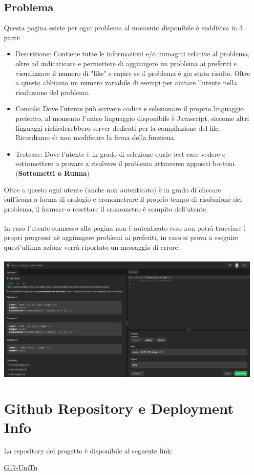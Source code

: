 \documentclass[11pt, a4paper]{article}
\theoremstyle{definition}
\begin{document}
\subsection{Problema}
Questa pagina esiste per ogni problema al momento disponibile è suddivisa in 3 parti:
\begin{itemize}
  \item Descrizione: Contiene tutte le informazioni e/o immagini relative al problema, oltre ad indicaticare e permettere di aggiungere un problema ai preferiti e visualizzare il numero di "like" e capire se il problema è gia stato risolto. Oltre a questo abbiamo un numero variabile di esempi per aiutare l'utente nella risoluzione del problema.
  \item Console: Dove l'utente può scrivere codice e selezionare il proprio linguaggio preferito, al momento l'unico linguaggio disponibile è Javascript, siccome altri linguaggi richiederebbero server dedicati per la compilazione del file. Ricordiamo di non modificare la firma della funziona.
  \item Testcase: Dove l'utente è in grado di selezione quale test case vedere e sottomettere o provare a risolvere il problema attraverso appositi bottoni. (\textbf{Sottometti o Runna})
\end{itemize}
Oltre a questo ogni utente (anche non autenticato) è in grado di cliccare sull'icona a forma di orologio e cronometrare il proprio tempo di risoluzione del problema, il fermare o resettare il cronometro è compito dell'utente.\\\\
In caso l'utente connesso alla pagina non è autenticato esso non potrà tracciare i propri progressi nè aggiungere problemi ai preferiti, in caso si prova a eseguire quest'ultima azione verrà riportato un messaggio di errore.\\\\
\includegraphics[width=\textwidth]{materiale/sito/Problema.png}

\newpage
\section{Github Repository e Deployment Info}
La repository del progetto è disponibile al seguente link:
\begin{center}
  \href{https://github.com/G17-UniTn}{G17-UniTn}
\end{center}
\end{document}
